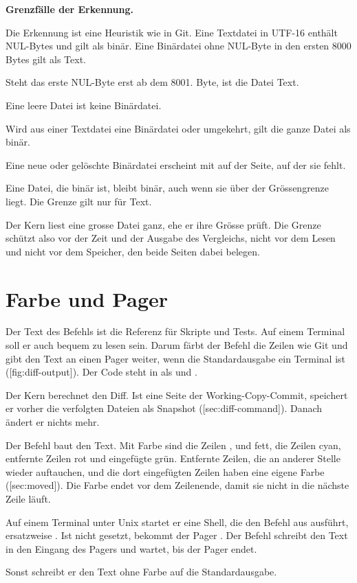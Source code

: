 \startinfobox
{\bf Grenzfälle der Erkennung.}
\startitemize
\item Die Erkennung ist eine Heuristik wie in Git. Eine Textdatei in UTF-16 enthält NUL-Bytes und
gilt als binär. Eine Binärdatei ohne NUL-Byte in den ersten 8000 Bytes gilt als Text.
\item Steht das erste NUL-Byte erst ab dem 8001. Byte, ist die Datei Text.
\item Eine leere Datei ist keine Binärdatei.
\item Wird aus einer Textdatei eine Binärdatei oder umgekehrt, gilt die ganze Datei als binär.
\item Eine neue oder gelöschte Binärdatei erscheint mit  auf der Seite,
auf der sie fehlt.
\item Eine Datei, die binär ist, bleibt binär, auch wenn sie über der Grössengrenze liegt.
Die Grenze gilt nur für Text.
\item Der Kern liest eine grosse Datei ganz, ehe er ihre Grösse prüft. Die Grenze schützt also
vor der Zeit und der Ausgabe des Vergleichs, nicht vor dem Lesen und nicht vor dem Speicher,
den beide Seiten dabei belegen.
\stopitemize
\stopinfobox

\section[sec:pager]{Farbe und Pager}

Der Text des Befehls  ist die Referenz für Skripte und Tests. Auf einem Terminal soll er
auch bequem zu lesen sein. Darum färbt der Befehl die Zeilen wie Git und gibt den Text an einen
Pager weiter, wenn die Standardausgabe ein Terminal ist ([fig:diff-output]). Der
Code steht in  als  und .

\startplacefigure[title={Wege der Ausgabe von \type{diff}},
    reference=fig:diff-output,location=here]
\stopplacefigure

\startitemize[n]
\item Der Kern berechnet den Diff. Ist eine Seite der Working-Copy-Commit, speichert er vorher
die verfolgten Dateien als Snapshot ([sec:diff-command]). Danach ändert er nichts
mehr.
\item Der Befehl baut den Text. Mit Farbe sind die Zeilen , \type{---} und
\type{+++} fett, die Zeilen  cyan, entfernte Zeilen rot und eingefügte grün. Entfernte
Zeilen, die an anderer Stelle wieder auftauchen, und die dort eingefügten Zeilen haben eine
eigene Farbe ([sec:moved]).
Die Farbe endet vor dem Zeilenende, damit sie nicht in die nächste Zeile läuft.
\item Auf einem Terminal unter Unix startet er eine Shell, die den Befehl aus 
ausführt, ersatzweise . Ist  nicht gesetzt, bekommt der Pager
. Der Befehl schreibt den Text in den Eingang des Pagers und wartet, bis der Pager
endet.
\item Sonst schreibt er den Text ohne Farbe auf die Standardausgabe.
\stopitemize

